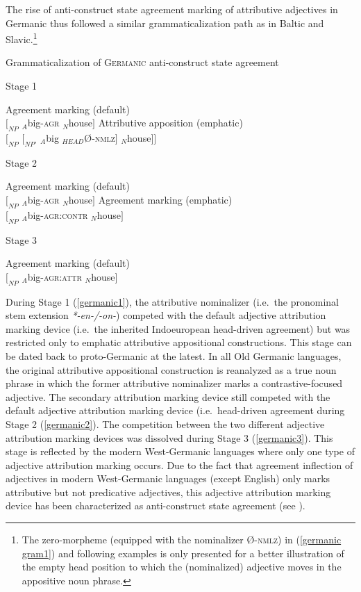 {The rise of anti-construct state agreement marking of attributive adjectives in Germanic thus followed a similar grammaticalization path as in Baltic and Slavic.\footnote{The zero-morpheme (equipped with the nominalizer Ø-\textsc{nmlz}) in (\ref{germanic gram1}) and following examples is only presented for a better illustration of the empty head position to which the (nominalized) adjective moves in the appositive noun phrase.}
\begin{exe}
\ex Grammaticalization of \textsc{Germanic} anti-construct state agreement \label{germanic gram1}
\begin{xlist}
\ex	Stage 1 \label{germanic1}
\begin{xlist}
\ex	Agreement marking (default)\\
$[_{NP}$ $_{A}$big-\textsc{agr} $_{N}$house$]$
\ex Attributive apposition (emphatic)\\
$[_{NP}$ $[_{NP'}$ $_{A}$big $_{HEAD}$Ø-\textsc{nmlz}$]$ $_{N}$house$] ]$\label{germanic art1}
\end{xlist}
\ex 	Stage 2 \label{germanic2}
\begin{xlist}
\ex	Agreement marking (default) \\
$[_{NP}$ $_{A}$big-\textsc{agr} $_{N}$house$]$
\ex	Agreement marking (emphatic) \\
$[_{NP}$ $_{A}$big-\textsc{agr:contr} $_{N}$house$]$\label{germanic ACAgr}
\end{xlist}
\ex 	Stage 3 \label{germanic3}
\begin{xlist}
\ex 	Agreement marking (default)\\
$[_{NP}$ $_{A}$big-\textsc{agr:attr} $_{N}$house$]$
\end{xlist}
\end{xlist}
\end{exe}
During Stage 1 (\ref{germanic1}), the attributive nominalizer (i.e.~the pronominal stem extension \textit{*-en-/-on-}) competed with the default adjective attribution marking device (i.e.~the inherited Indoeuropean head-driven agreement) but was restricted only to emphatic attributive appositional constructions. This stage can be dated back to proto-Germanic at the latest. In all Old Germanic languages, the original attributive appositional construction is reanalyzed as a true noun phrase in which the former attributive nominalizer marks a contrastive-focused adjective. The secondary attribution marking device still competed with the default adjective attribution marking device (i.e.~head-driven agreement during Stage 2 (\ref{germanic2}). The competition between the two different adjective attribution marking devices was dissolved during Stage 3 (\ref{germanic3}). This stage is reflected by the modern West-Germanic languages where only one type of adjective attribution marking occurs. Due to the fact that agreement inflection of adjectives in modern West-Germanic languages (except English) only marks attributive but not predicative adjectives, this adjective attribution marking device has been characterized as anti-construct state agreement (see ).

}
